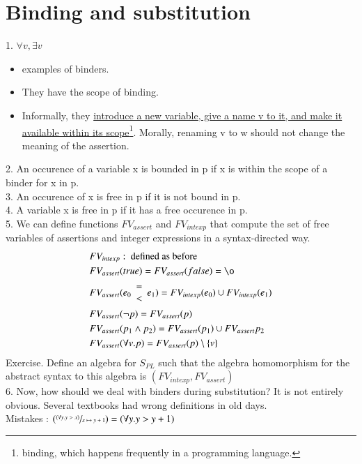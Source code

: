 \documentclass{article}[12pt]
\begin{document}
\section{Binding and substitution}
1. $\forall v, \exists v$
\begin{itemize}
    \item examples of binders.
    \item They have the scope of binding.
    \item Informally, they \underline{introduce a new variable, give a name v to it, and make it available within its scope}\footnote{binding, which happens frequently in a programming language.}. Morally, renaming v to w should not change the meaning of the assertion.
\end{itemize}
2. An occurence of a variable x is bounded in p if x is within the scope of a binder for x in p.\\
3. An occurence of x is free in p if it is not bound in p. \\
4. A variable x is free in p if it has a free occurence in p. \\
5. We can define functions $FV_{assert}$ and $FV_{intexp}$ that compute the set of free variables of assertions and integer expressions in a syntax-directed way.
\begin{align*}
    &FV_{intexp} : \text{ defined as before} \\
    &FV_{assert}(true) = FV_{assert}(false) = \o \\
    &FV_{assert}(e_0 \begin{array}{c}= \\ <\end{array} e_1) = FV_{intexp}(e_0) \cup FV_{intexp}(e_1) \\
    &FV_{assert}(\neg p) = FV_{assert}(p) \\
    &FV_{assert}(p_1 \wedge p_2) = FV_{assert}(p_1) \cup FV_{assert}{p_2} \\
    &FV_{assert}(\forall v. p) = FV_{assert}(p) \setminus \{v\}
\end{align*}
Exercise. Define an algebra for $S_{PL}$ such that the algebra homomorphism for the abstract syntax to this algebra is $(FV_{intexp}, FV_{assert})$ \\
6. Now, how should we deal with binders during substitution? It is not entirely obvious. Several textbooks had wrong definitions in old days. \\
Mistakes : $(\sfrac{(\forall y. y > x)}{x\mapsto y+1})=(\forall y.y>y+1)$ \\
\end{document}

